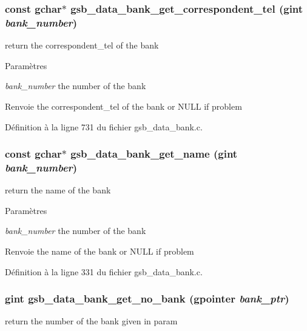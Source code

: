 \subsubsection[{gsb\_\-data\_\-bank\_\-get\_\-correspondent\_\-tel}]{\setlength{\rightskip}{0pt plus 5cm}const gchar$\ast$ gsb\_\-data\_\-bank\_\-get\_\-correspondent\_\-tel (gint {\em bank\_\-number})}\label{gsb__data__bank_8c_a597edbed255d22aa30fbfbf7f85403d9}
return the correspondent\_\-tel of the bank


\begin{DoxyParams}{Paramètres}
\item[{\em bank\_\-number}]the number of the bank\end{DoxyParams}
\begin{DoxyReturn}{Renvoie}
the correspondent\_\-tel of the bank or NULL if problem 
\end{DoxyReturn}


Définition à la ligne 731 du fichier gsb\_\-data\_\-bank.c.

\subsubsection[{gsb\_\-data\_\-bank\_\-get\_\-name}]{\setlength{\rightskip}{0pt plus 5cm}const gchar$\ast$ gsb\_\-data\_\-bank\_\-get\_\-name (gint {\em bank\_\-number})}\label{gsb__data__bank_8c_a81012ac3ba7f570044e23fdf64c20693}
return the name of the bank


\begin{DoxyParams}{Paramètres}
\item[{\em bank\_\-number}]the number of the bank\end{DoxyParams}
\begin{DoxyReturn}{Renvoie}
the name of the bank or NULL if problem 
\end{DoxyReturn}


Définition à la ligne 331 du fichier gsb\_\-data\_\-bank.c.

\subsubsection[{gsb\_\-data\_\-bank\_\-get\_\-no\_\-bank}]{\setlength{\rightskip}{0pt plus 5cm}gint gsb\_\-data\_\-bank\_\-get\_\-no\_\-bank (gpointer {\em bank\_\-ptr})}\label{gsb__data__bank_8c_aeaa802abf5fdc54d005a11ab65a537dc}
return the number of the bank given in param


